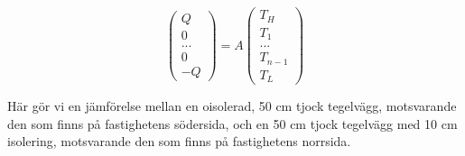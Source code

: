 \begin{equation}
\label{eq:staticwallmethod:full}
\begin{pmatrix}
Q\\0\\...\\0\\-Q
\end{pmatrix} = A
\begin{pmatrix}
T_H\\T_1\\...\\T_{n-1}\\T_L
\end{pmatrix}
\end{equation}

Här gör vi en jämförelse mellan en oisolerad, 50 cm tjock tegelvägg, motsvarande den som finns på fastighetens södersida, och en 50 cm tjock tegelvägg med 10 cm isolering, motsvarande den som finns på fastighetens norrsida.


